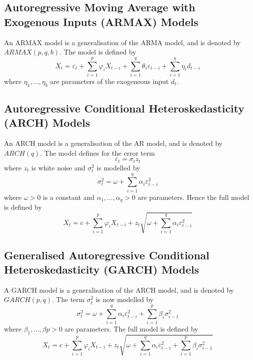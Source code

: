 \documentclass[11pt]{report} %
\begin{document}
\subsection{Autoregressive Moving Average with Exogenous Inputs (ARMAX) Models}
An ARMAX model is a generalisation of the ARMA model, and is denoted by $ARMAX\left(p, q, b\right)$. The model is defined by
\begin{equation}
X_{t} = \varepsilon_{t} + \sum_{i = 1}^{p}\varphi_{i}X_{t - i} + \sum_{i = 1}^{q}\theta_{i}\varepsilon_{t - i} + \sum_{i = 1}^{b}\eta_{i}d_{t - i}
\end{equation}
where $\eta_{1}, \dots, \eta_{b}$ are parameters of the exogeneous input $d_{t}$.

\subsection{Autoregressive Conditional Heteroskedasticity (ARCH) Models}
An ARCH model is a generalisation of the AR model, and is denoted by $ARCH\left(q\right)$. The model defines for the error term
\begin{equation}
\varepsilon_{t} = \sigma_{t}z_{t}
\end{equation}
where $z_{t}$ is white noise and $\sigma^{2}_{t}$ is modelled by
\begin{equation}
\sigma^{2}_{t} = \omega + \sum_{i = 1}^{q}\alpha_{i}\varepsilon^{2}_{t - i}
\end{equation}
where $\omega > 0$ is a constant and $\alpha_{1}, \dots, \alpha_{q} > 0$ are parameters. Hence the full model is defined by
\begin{equation}
X_{t} = c + \sum_{i = 1}^{p}\varphi_{i}X_{t - i} + z_{t}\sqrt{\omega + \sum_{i = 1}^{q}\alpha_{i}\varepsilon^{2}_{t - i}}
\end{equation}

\subsection{Generalised Autoregressive Conditional Heteroskedasticity (GARCH) Models}
A GARCH model is a generalisation of the ARCH model, and is denoted by $GARCH\left(p, q\right)$. The term $\sigma^{2}_{t}$ is now modelled by
\begin{equation}
\sigma^{2}_{t} = \omega + \sum_{i = 1}^{q}\alpha_{i}\varepsilon^{2}_{t - i} + \sum_{i = 1}^{p}\beta_{i}\sigma^{2}_{i - 1}
\end{equation}
where $\beta_{1}, \dots, \beta{p} > 0$ are parameters. The full model is defined by
\begin{equation}
X_{t} = c + \sum_{i = 1}^{p}\varphi_{i}X_{t - i} + z_{t}\sqrt{\omega + \sum_{i = 1}^{q}\alpha_{i}\varepsilon^{2}_{t - i} + \sum_{i = 1}^{p}\beta_{i}\sigma^{2}_{i - 1}}
\end{equation}
\end{document}
